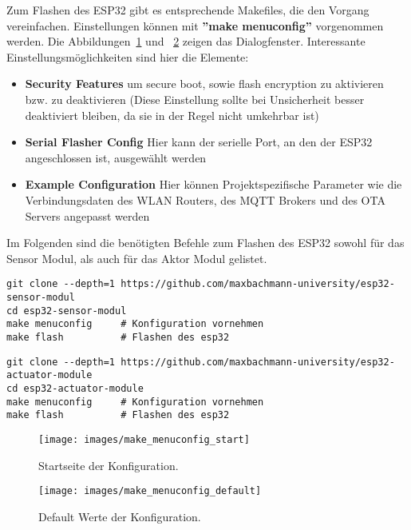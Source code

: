 Zum Flashen des ESP32 gibt es entsprechende Makefiles, die den Vorgang vereinfachen. Einstellungen können mit \textbf{''make menuconfig''} vorgenommen werden. Die Abbildungen~\ref{fig:config_start} und ~\ref{fig:config_default} zeigen das Dialogfenster.
Interessante Einstellungsmöglichkeiten sind hier die Elemente:
\begin{itemize}
	\item \textbf{Security Features} um secure boot, sowie flash encryption zu aktivieren bzw. zu deaktivieren (Diese Einstellung sollte bei Unsicherheit besser deaktiviert bleiben, da sie in der Regel nicht umkehrbar ist)
	\item \textbf{Serial Flasher Config} Hier kann der serielle Port, an den der ESP32 angeschlossen ist, ausgewählt werden
	\item \textbf{Example Configuration} Hier können Projektspezifische Parameter wie die Verbindungsdaten des WLAN Routers, des MQTT Brokers und des OTA Servers angepasst werden
\end{itemize}

Im Folgenden sind die benötigten Befehle zum Flashen des ESP32 sowohl für das Sensor Modul, als auch für das Aktor Modul gelistet.
\begin{lstlisting}
git clone --depth=1 https://github.com/maxbachmann-university/esp32-sensor-modul
cd esp32-sensor-modul
make menuconfig		# Konfiguration vornehmen
make flash			# Flashen des esp32
\end{lstlisting}

\begin{lstlisting}
git clone --depth=1 https://github.com/maxbachmann-university/esp32-actuator-module
cd esp32-actuator-module
make menuconfig		# Konfiguration vornehmen
make flash			# Flashen des esp32
\end{lstlisting}

\begin{figure}[hbt]
	\centering
	\texttt{[image: images/make\_menuconfig\_start]}
	\caption[Konfiguration Startseite]{Startseite der Konfiguration.}
	\label{fig:config_start}
\end{figure}

\begin{figure}[hbt]
	\centering
	\texttt{[image: images/make\_menuconfig\_default]}
	\caption[Konfiguration Standard]{Default Werte der Konfiguration.}
	\label{fig:config_default}
\end{figure}


